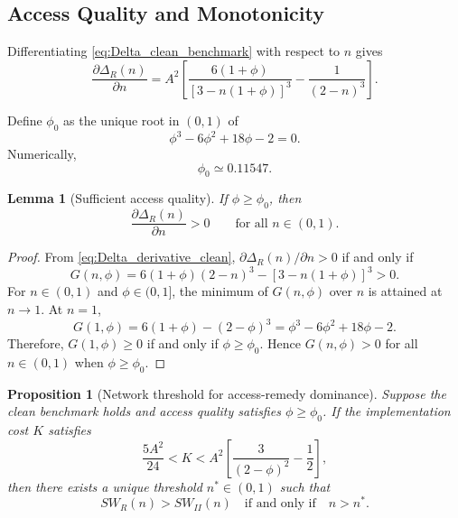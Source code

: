 \documentclass[12pt]{article}
\newtheorem{lemma}{Lemma}
\newtheorem{proposition}{Proposition}
\begin{document}
\subsection{Access Quality and Monotonicity}

Differentiating \eqref{eq:Delta_clean_benchmark} with respect to $n$ gives
\begin{equation}
\frac{\partial \Delta_R(n)}{\partial n}=A^2\left[\frac{6(1+\phi)}{[3-n(1+\phi)]^3}-\frac{1}{(2-n)^3}\right].
\label{eq:Delta_derivative_clean}
\end{equation}

Define $\phi_0$ as the unique root in $(0,1)$ of
\begin{equation}
\phi^3-6\phi^2+18\phi-2=0.
\label{eq:phi0_definition}
\end{equation}
Numerically,
\begin{equation}
\phi_0\simeq0.11547.
\end{equation}

\begin{lemma}[Sufficient access quality]
If $\phi\geq\phi_0$, then
\begin{equation}
\frac{\partial \Delta_R(n)}{\partial n}>0\qquad\text{for all }n\in(0,1).
\end{equation}
\end{lemma}

\begin{proof}
From \eqref{eq:Delta_derivative_clean}, $\partial\Delta_R(n)/\partial n>0$ if and only if
\begin{equation}
G(n,\phi)=6(1+\phi)(2-n)^3-[3-n(1+\phi)]^3>0.
\end{equation}
For $n\in(0,1)$ and $\phi\in(0,1]$, the minimum of $G(n,\phi)$ over $n$ is attained at $n\to1$.
At $n=1$,
\begin{equation}
G(1,\phi)=6(1+\phi)-(2-\phi)^3=\phi^3-6\phi^2+18\phi-2.
\end{equation}
Therefore, $G(1,\phi)\geq0$ if and only if $\phi\geq\phi_0$. Hence $G(n,\phi)>0$ for all $n\in(0,1)$ when $\phi\geq\phi_0$.
\end{proof}

\begin{proposition}[Network threshold for access-remedy dominance]
Suppose the clean benchmark holds and access quality satisfies $\phi\geq\phi_0$. If the implementation cost $K$ satisfies
\begin{equation}
\frac{5A^2}{24}<K<A^2\left[\frac{3}{(2-\phi)^2}-\frac{1}{2}\right],
\label{eq:K_condition_clean}
\end{equation}
then there exists a unique threshold $n^*\in(0,1)$ such that
\begin{equation}
SW_R(n)>SW_{II}(n)\quad\text{if and only if}\quad n>n^*.
\end{equation}
\end{proposition}
\end{document}

